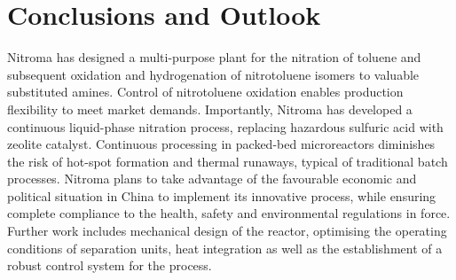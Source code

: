 \section{Conclusions and Outlook}
\label{sec:conclu}
Nitroma has designed a multi-purpose plant for the nitration of toluene and subsequent oxidation and hydrogenation of nitrotoluene isomers to valuable substituted amines.
Control of nitrotoluene oxidation enables production flexibility to meet market demands.
Importantly, Nitroma has developed a continuous liquid-phase nitration process, replacing hazardous sulfuric acid with zeolite catalyst.
Continuous processing in packed-bed microreactors diminishes the risk of hot-spot formation and thermal runaways, typical of traditional batch processes.
Nitroma plans to take advantage of the favourable economic and political situation in China to implement its innovative process, while ensuring complete compliance to the health, safety and environmental regulations in force.
Further work includes mechanical design of the reactor, optimising the operating conditions of separation units, heat integration as well as the establishment of a robust control system for the process.
